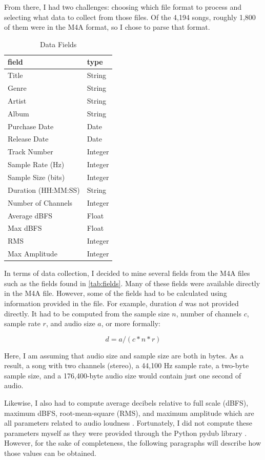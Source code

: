 \documentclass[journal]{vgtc}                %
\begin{document}
From there, I had two challenges: choosing which file format to process and
selecting what data to collect from those files. Of the 4,194 songs, roughly
1,800 of them were in the M4A format, so I chose to parse that format.

\begin{table}[h]
  \caption{Data Fields}
  \label{tab:fields}
  \scriptsize%
	\centering%
  \begin{tabu}{l l}
  \toprule
    field & type \\
  \midrule
  Title & String \\
  Genre & String \\
  Artist & String \\
  Album & String \\
  Purchase Date & Date \\
  Release Date & Date \\
  Track Number & Integer \\
  Sample Rate (Hz) & Integer \\
  Sample Size (bits) & Integer \\
  Duration (HH:MM:SS) & String \\
  Number of Channels & Integer \\
  Average dBFS & Float \\
  Max dBFS & Float \\
  RMS & Integer \\
  Max Amplitude & Integer \\
  \midrule
  \end{tabu}%
\end{table}

In terms of data collection, I decided to mine several fields from the M4A files
such as the fields found in \autoref{tab:fields}. Many of these fields were
available directly in the M4A file. However, some of the fields had to be
calculated using information provided in the file. For example, duration $d$ was
not provided directly. It had to be computed from the sample size $n$, number of
channels $c$, sample rate $r$, and audio size $a$, or more formally:

\[ d = a / (c * n * r) \]

Here, I am assuming that audio size and sample size are both in bytes. As a
result, a song with two channels (stereo), a 44,100 Hz sample rate, a two-byte
sample size, and a 176,400-byte audio size would contain just one second of
audio.

Likewise, I also had to compute average decibels relative to full scale (dBFS),
maximum dBFS, root-mean-square (RMS), and maximum amplitude which are all
parameters related to audio loudness \cite{Price:2007:dBFS}. Fortunately, I did
not compute these parameters myself as they were provided through the Python
pydub library \cite{Robert:2018:API}. However, for the sake of completeness,
the following paragraphs will describe how those values can be obtained.
\end{document}
